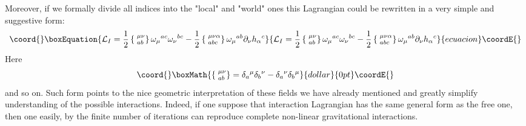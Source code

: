 \documentclass[a4paper,12pt]{article}
\begin{document}
Moreover, if we formally divide all indices into the "local" and
"world" ones this Lagrangian could be rewritten in a very simple and
suggestive form:
\begin{equation}\coord{}\boxEquation{
{\cal L}_I = \frac{1}{2} \left\{ \phantom{|}^{\mu\nu}_{ab}
 \right\} \omega_\mu{}^{ac} \omega_\nu{}^{bc} - \frac{1}{2}
\left\{ \phantom{|}^{\mu\nu\alpha}_{abc} \right\}
\omega_\mu{}^{ab} \partial_\nu h_\alpha{}^c \label{eq3}
}{
{\cal L}_I = \frac{1}{2} \left\{ \phantom{|}^{\mu\nu}_{ab}
 \right\} \omega_\mu{}^{ac} \omega_\nu{}^{bc} - \frac{1}{2}
\left\{ \phantom{|}^{\mu\nu\alpha}_{abc} \right\}
\omega_\mu{}^{ab} \partial_\nu h_\alpha{}^c }{ecuacion}\coordE{}\end{equation}
Here
$$\coord{}\boxMath{
\left\{ \phantom{|}^{\mu\nu}_{ab} \right\} = \delta_a{}^\mu
\delta_b{}^\nu - \delta_a{}^\nu \delta_b{}^\mu
}{dollar}{0pt}\coordE{}$$
and so on. Such form points to the nice geometric interpretation of
these fields we have already mentioned and greatly simplify
understanding of the possible interactions. Indeed, if one suppose
that interaction Lagrangian has the same general form as the free one,
then one easily, by the finite number of iterations can reproduce
complete non-linear gravitational interactions.
\end{document}
